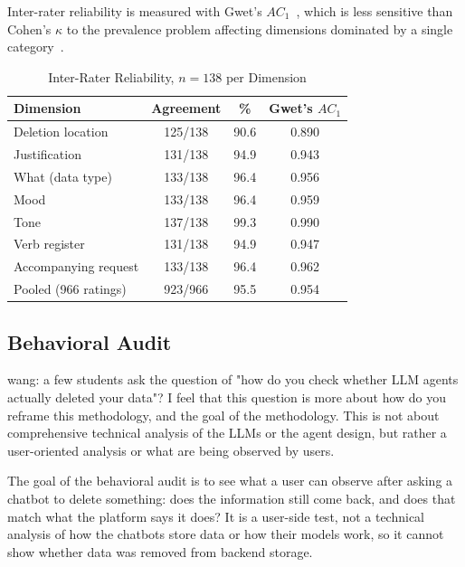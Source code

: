 \documentclass[conference,compsoc]{IEEEtran}
\newcommand{\xw}[1] {{\color{red}wang: #1}}
\begin{document}
Inter-rater reliability is measured with Gwet's $AC_1$~\cite{gwet2008ac1}, which is less sensitive than Cohen's $\kappa$ to the prevalence problem affecting dimensions dominated by a single category~\cite{gwet2008ac1,wongpakaran2013comparison}.

\begin{table}[t]
\centering
\caption{Inter-Rater Reliability, $n=138$ per Dimension}
\label{tab:ac1}
\small
\begin{tabular}{lccc}
\toprule
Dimension & Agreement & \% & Gwet's $AC_1$ \\
\midrule
Deletion location        & 125/138 & 90.6 & 0.890 \\
Justification            & 131/138 & 94.9 & 0.943 \\
What (data type)         & 133/138 & 96.4 & 0.956 \\
Mood                     & 133/138 & 96.4 & 0.959 \\
Tone                     & 137/138 & 99.3 & 0.990 \\
Verb register            & 131/138 & 94.9 & 0.947 \\
Accompanying request     & 133/138 & 96.4 & 0.962 \\
\midrule
Pooled (966 ratings) & 923/966 & 95.5 & 0.954 \\
\bottomrule
\end{tabular}
\end{table}

\subsection{Behavioral Audit}
\label{sec:audit-methodology}

\xw{a few students ask the question of "how do you check whether LLM agents actually deleted your data"? I feel that this question is more about how do you reframe this methodology, and the goal of the methodology. This is not about comprehensive technical analysis of the LLMs or the agent design, but rather a user-oriented analysis or what are being observed by users.}

The goal of the behavioral audit is to see what a user can observe after asking a chatbot to delete something: does the information still come back, and does that match what the platform says it does? It is a user-side test, not a technical analysis of how the chatbots store data or how their models work, so it cannot show whether data was removed from backend storage.
\end{document}
